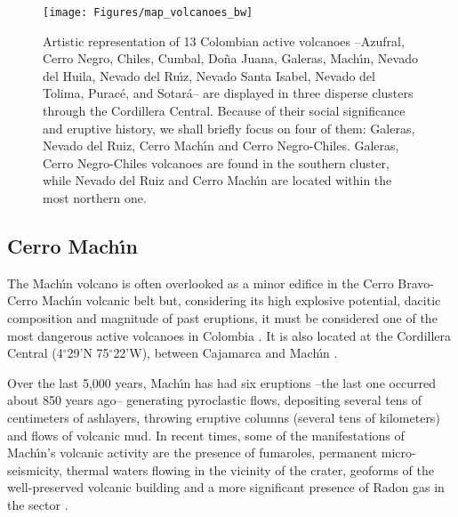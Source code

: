 \documentclass[letterpaper,10pt,titlepage,linenumber]{article}
\begin{document}
\begin{figure}[!ht]
\begin{center}
\texttt{[image: Figures/map\_volcanoes\_bw]}
\caption{Artistic representation of 13 Colombian active volcanoes --Azufral, Cerro Negro, Chiles, Cumbal, Do\~na Juana, Galeras, Mach\'{\i}n,  Nevado del Huila,  Nevado del Ru\'{\i}z,  Nevado Santa Isabel,  Nevado del Tolima,  Purac\'e, and Sotar\'a-- are displayed in three disperse clusters through the Cordillera Central. Because of their social significance and eruptive history, we shall briefly focus on four of them: Galeras, Nevado del Ruiz, Cerro Mach\'{\i}n and Cerro Negro-Chiles. Galeras, Cerro Negro-Chiles volcanoes are found in the southern cluster, while Nevado del Ruiz and Cerro Mach\'{\i}n are located within the most northern one.}
\label{ColombiaVolcanoesMap}
\end{center}
\end{figure}


\subsection{Cerro Mach\'{\i}n}
\label{subsec:Machin}
The Mach\'{\i}n volcano is often overlooked as a minor edifice in the Cerro Bravo-Cerro Mach\'{\i}n volcanic belt but, considering its high explosive potential, dacitic composition and magnitude of past eruptions, it must be considered one of the most dangerous active volcanoes in Colombia \cite{Cortes2001}. It is also located at the Cordillera Central (4$^{\circ}$29'N 75$^{\circ}$22'W), between Cajamarca and Mach\'{\i}n \cite{CepedaEtal1995}. 

Over the last 5,000 years, Mach\'{\i}n has had six eruptions --the last one occurred about 850 years ago-- generating pyroclastic flows, depositing several tens of centimeters of ashlayers, throwing eruptive columns (several tens of kilometers) and flows of volcanic mud. In recent times, some of the manifestations of Mach\'{\i}n's volcanic activity are the presence of fumaroles, permanent micro-seismicity, thermal waters flowing in the vicinity of the crater, geoforms of the well-preserved volcanic building and a more significant presence of Radon gas in the sector \cite{Cortes2001, Rueda2005}.
\end{document}
